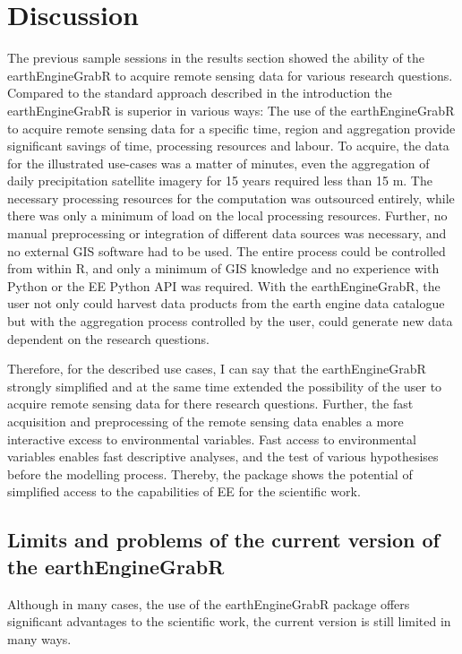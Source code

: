 \chapter{Discussion}


The previous sample sessions in the results section showed the ability of the earthEngineGrabR to acquire remote sensing data for various research questions.
Compared to the standard approach described in the introduction the earthEngineGrabR is superior in various ways:
The use of the earthEngineGrabR to acquire remote sensing data for a specific time, region and aggregation provide significant savings of time, processing resources and labour. To acquire, the data for the illustrated use-cases was a matter of minutes, even the aggregation of daily precipitation satellite imagery for 15 years required less than 15 m. The necessary processing resources for the computation was outsourced entirely, while there was only a minimum of load on the local processing resources. Further, no manual preprocessing or integration of different data sources was necessary, and no external GIS software had to be used. The entire process could be controlled from within R, and only a minimum of GIS knowledge and no experience with Python or the EE Python API was required. With the earthEngineGrabR, the user not only could harvest data products from the earth engine data catalogue but with the aggregation process controlled by the user, could generate new data dependent on the research questions. 

Therefore, for the described use cases, I can say that the earthEngineGrabR strongly simplified and at the same time extended the possibility of the user to acquire remote sensing data for there research questions. Further, the fast acquisition and preprocessing of the remote sensing data enables a more interactive excess to environmental variables.
Fast access to environmental variables enables fast descriptive analyses, and the test of various hypothesises before the modelling process.
Thereby, the package shows the potential of simplified access to the capabilities of EE for the scientific work.


\section{Limits and problems of the current version of the earthEngineGrabR}

Although in many cases, the use of the earthEngineGrabR package offers significant advantages to the scientific work, the current version is still limited in many ways. 

